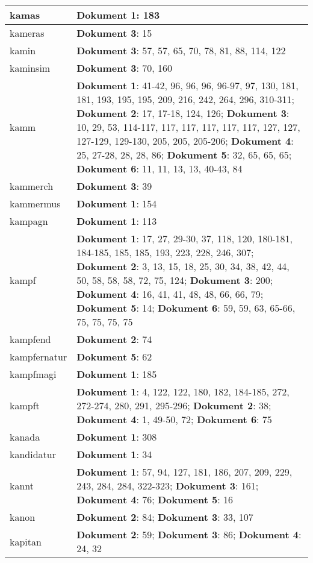 \documentclass[a5paper]{article}
\begin{document}
\begin{longtable}[l]{|l|p{3in}|}
\hline
kamas & \textbf{Dokument 1}: 183 \\
\hline
kameras & \textbf{Dokument 3}: 15 \\
\hline
kamin & \textbf{Dokument 3}: 57, 57, 65, 70, 78, 81, 88, 114, 122 \\
\hline
kaminsim & \textbf{Dokument 3}: 70, 160 \\
\hline
kamm & \textbf{Dokument 1}: 41-42, 96, 96, 96, 96-97, 97, 130, 181, 181, 193, 195, 195, 209, 216, 242, 264, 296, 310-311; \textbf{Dokument 2}: 17, 17-18, 124, 126; \textbf{Dokument 3}: 10, 29, 53, 114-117, 117, 117, 117, 117, 117, 127, 127, 127-129, 129-130, 205, 205, 205-206; \textbf{Dokument 4}: 25, 27-28, 28, 28, 86; \textbf{Dokument 5}: 32, 65, 65, 65; \textbf{Dokument 6}: 11, 11, 13, 13, 40-43, 84 \\
\hline
kammerch & \textbf{Dokument 3}: 39 \\
\hline
kammermus & \textbf{Dokument 1}: 154 \\
\hline
kampagn & \textbf{Dokument 1}: 113 \\
\hline
kampf & \textbf{Dokument 1}: 17, 27, 29-30, 37, 118, 120, 180-181, 184-185, 185, 185, 193, 223, 228, 246, 307; \textbf{Dokument 2}: 3, 13, 15, 18, 25, 30, 34, 38, 42, 44, 50, 58, 58, 58, 72, 75, 124; \textbf{Dokument 3}: 200; \textbf{Dokument 4}: 16, 41, 41, 48, 48, 66, 66, 79; \textbf{Dokument 5}: 14; \textbf{Dokument 6}: 59, 59, 63, 65-66, 75, 75, 75, 75 \\
\hline
kampfend & \textbf{Dokument 2}: 74 \\
\hline
kampfernatur & \textbf{Dokument 5}: 62 \\
\hline
kampfmagi & \textbf{Dokument 1}: 185 \\
\hline
kampft & \textbf{Dokument 1}: 4, 122, 122, 180, 182, 184-185, 272, 272-274, 280, 291, 295-296; \textbf{Dokument 2}: 38; \textbf{Dokument 4}: 1, 49-50, 72; \textbf{Dokument 6}: 75 \\
\hline
kanada & \textbf{Dokument 1}: 308 \\
\hline
kandidatur & \textbf{Dokument 1}: 34 \\
\hline
kannt & \textbf{Dokument 1}: 57, 94, 127, 181, 186, 207, 209, 229, 243, 284, 284, 322-323; \textbf{Dokument 3}: 161; \textbf{Dokument 4}: 76; \textbf{Dokument 5}: 16 \\
\hline
kanon & \textbf{Dokument 2}: 84; \textbf{Dokument 3}: 33, 107 \\
\hline
kapitan & \textbf{Dokument 2}: 59; \textbf{Dokument 3}: 86; \textbf{Dokument 4}: 24, 32 \\

\end{longtable}
\end{document}
